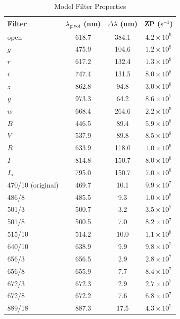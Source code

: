 \begin{table}
\begin{center}
\caption{Model Filter Properties}
\label{table:huitzi-f20-model-filter-properties}
\medskip
\begin{tabular}{lccc}
\hline
Filter&$\lambda_\mathrm{pivot}$ (nm)&$\Delta\lambda$ (nm)&ZP ($\mathrm{s}^{-1}$)\\
\hline
open		& 618.7& \phantom{}384.1&$4.2 \times 10^{9}$\\
$g$		& 475.9& \phantom{}104.6&$1.2 \times 10^{9}$\\
$r$		& 617.2& \phantom{}132.4&$1.3 \times 10^{9}$\\
$i$			& 747.4& \phantom{}131.5&$8.0 \times 10^{8}$\\
$z$		& 862.8& \phantom{0}94.8&$3.0 \times 10^{8}$\\
$y$		& 973.3& \phantom{0}64.2&$8.6 \times 10^{7}$\\
$w$		& 668.4& \phantom{}264.6&$2.2 \times 10^{9}$\\
$B$		& 446.5& \phantom{0}89.4&$5.9 \times 10^{8}$\\
$V$		& 537.9& \phantom{0}89.8&$8.5 \times 10^{8}$\\
$R$		& 633.9& \phantom{}118.0&$1.0 \times 10^{9}$\\
$I$		& 814.8& \phantom{}150.7&$8.0 \times 10^{8}$\\
$\mbox{$I_\mathrm{s}$}$		& 795.0& \phantom{}150.7&$7.0 \times 10^{8}$\\
470/10 (original)	& 469.7& \phantom{0}10.1&$9.9 \times 10^{7}$\\
486/8		& 485.5& \phantom{00}9.3&$1.0 \times 10^{8}$\\
501/3		& 500.7& \phantom{00}3.2&$3.5 \times 10^{7}$\\
501/8		& 500.5& \phantom{00}7.0&$8.2 \times 10^{7}$\\
515/10	& 514.2& \phantom{0}10.0&$1.1 \times 10^{8}$\\
640/10	& 638.9& \phantom{00}9.9&$9.8 \times 10^{7}$\\
656/3		& 656.5& \phantom{00}2.9&$2.8 \times 10^{7}$\\
656/8		& 655.9& \phantom{00}7.7&$8.4 \times 10^{7}$\\
672/3		& 672.3& \phantom{00}2.9&$2.7 \times 10^{7}$\\
672/8		& 672.2& \phantom{00}7.6&$6.8 \times 10^{7}$\\
889/18	& 887.3& \phantom{0}17.5&$4.3 \times 10^{7}$\\
\hline
\end{tabular}
\end{center}
\end{table}

